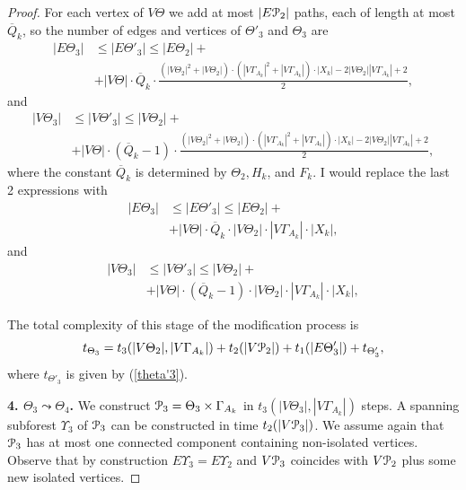 \documentclass[a4paper,12pt]{article}
\newcommand{\G}{\Gamma }
\newcommand{\T}{\Theta }
\newcommand{\U}{\Upsilon }
\newcommand{\cP}{{\cal{P}}}
\numberwithin{equation}{section}
\numberwithin{figure}{section}
\begin{document}
\begin{proof}
For each vertex of $V\T$ we add at most $|E\cP_2|$ paths, each
of length at most $\overline Q_k$, so the number of 
edges and vertices of $\T'_3$ and $\T_3$ are 
\begin{equation}\label{eztheta3}
\begin{split}
|E\T_3| &\le |E\T'_3|\le |E\T_2|+\\ &+|V\T|\cdot
\overline{Q}_k\cdot \frac{(|V\T_2|^2+|V\T_2|)\cdot
(|V\G_{A_k}|^2+|V\G_{A_k}|) \cdot |X_k|
-2|V\T_2||V\G_{A_k}|+2}{2},
\end{split}
\end{equation}
and 
\begin{equation}\label{vtheta3}
\begin{split}
|V\T_3| &\le |V \T'_3|\le |V\T_2|+\\
&+|V\T|\cdot(\overline{Q}_k-1)\cdot \frac{(|V\T_2|^2+|V\T_2|)\cdot
(|V\G_{A_k}|^2+|V\G_{A_k}|) \cdot |X_k| -2|V\T_2||V\G_{A_k}|+2
}{2},
\end{split}
\end{equation}
where the constant $\overline{Q}_k$ is determined  by $\T_2, H_k$, and
$F_k$.
{\ajd I would replace the last 2 expressions with
\[
\begin{split}
|E\T_3| &\le |E\T'_3|\le |E\T_2|+\\ 
        &+|V\T|\cdot
\overline{Q}_k\cdot 
|V\T_2|\cdot |V \G_{A_k}|\cdot |X_k|,
\end{split}
\]
and
\[
\begin{split}
|V\T_3| &\le |V \T'_3|\le |V\T_2|+\\
&+|V\T|\cdot(\overline{Q}_k-1)\cdot 
|V\T_2|\cdot |V \G_{A_k}|\cdot |X_k|,
\end{split}
\]
}


The total complexity of this stage of the modification process is
\begin{equation}\label{theta3}
t_{\T_3} = t_3(|V \T_2|, |V \G_{A_k}|) + t_2(|V\cP_2|)+
t_1(|E\T'_3|) + t_{\T'_3},
\end{equation}
where $t_{\T'_3}$ is given by (\ref{theta'3}).


{\bf 4. $\T_3 \leadsto \T_4$.} We construct $\cP_3=\T_3\times
\G_{A_k}$ in  $t_3(|V \T_3|, |V \G_{A_k}|)$ steps. A
spanning subforest $\U_3$ of $\cP_3$ can be constructed in time
$t_2(|V\cP_3|)$. We assume again that $\cP_3$ has at most one connected
component containing non-isolated vertices. 
Observe that by construction $E\U_3 = E\U_2$ and $V\cP_3$ coincides
with $V\cP_2$ plus some new isolated vertices. %


\end{proof}
\end{document}
